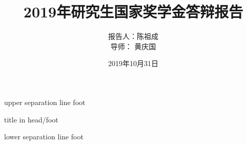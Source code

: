 \documentclass[xcolor=dvipsnames]{beamer} %
\begin{document}
\kaishu
{}
{%
	\begin{beamercolorbox}[colsep=1.5pt]{upper separation line foot}
    \end{beamercolorbox}
    \begin{beamercolorbox}[ht=2.5ex,dp=1.125ex,%
      leftskip=.3cm,rightskip=.3cm plus1fil]{title in head/foot}%
      \hfill%
      {\insertshorttitle}%
      \hfill%
      {\insertshortdate}%
    \end{beamercolorbox}%
    \begin{beamercolorbox}[colsep=1.5pt]{lower separation line foot}
    \end{beamercolorbox}
}



\title{2019年研究生国家奖学金答辩报告}
\author[陈祖成]{\Large 报告人：陈祖成
    \\ 导\quad 师： 黄庆国}

\date{2019年10月31日}



\begin{frame}[plain]
\titlepage
\end{frame}

\end{document}
